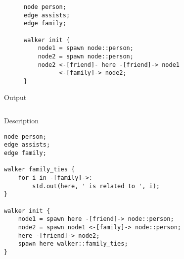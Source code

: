 \begin{description}
    \begin{lstlisting}[caption={Chaining node connections using the connect operator}]
node person;
edge assists;
edge family;

walker init {
    node1 = spawn node::person;
    node2 = spawn node::person;
    node2 <-[friend]- here -[friend]-> node1
          <-[family]-> node2;
}
    \end{lstlisting}
    \item[Output] \texttt{}
          \begin{lstlisting}[language=shell]
        \end{lstlisting}
    \item[Description] \texttt{}
\end{description}

\begin{description}
    \begin{lstlisting}[caption={Walkers spawning other walkers}]
node person;
edge assists;
edge family;

walker family_ties {
    for i in -[family]->:
        std.out(here, ' is related to ', i);
}

walker init {
    node1 = spawn here -[friend]-> node::person;
    node2 = spawn node1 <-[family]-> node::person;
    here -[friend]-> node2;
    spawn here walker::family_ties;
}
    \end{lstlisting}
    \item[Output] \texttt{}
          \begin{lstlisting}[language=shell]
        \end{lstlisting}
    \item[Description] \texttt{}
\end{description}



